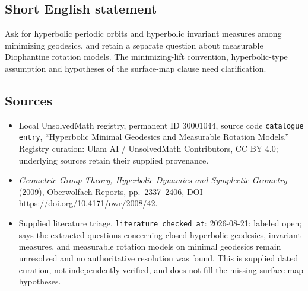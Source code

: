 \documentclass[11pt]{article}
\begin{document}
\subsection{Short English statement}
Ask for hyperbolic periodic orbits and hyperbolic invariant measures among minimizing geodesics, and retain a separate question about measurable Diophantine rotation models. The minimizing-lift convention, hyperbolic-type assumption and hypotheses of the surface-map clause need clarification.
\subsection{Sources}
\begin{itemize}
\item Local UnsolvedMath registry, permanent ID \(30001044\), source code \texttt{catalogue entry}, ``Hyperbolic Minimal Geodesics and Measurable Rotation Models.'' Registry curation: Ulam AI / UnsolvedMath Contributors, CC BY 4.0; underlying sources retain their supplied provenance.
\item \emph{Geometric Group Theory, Hyperbolic Dynamics and Symplectic Geometry} (2009), Oberwolfach Reports, pp.\ 2337--2406, DOI \url{https://doi.org/10.4171/owr/2008/42}.
\item Supplied literature triage, \texttt{literature\_checked\_at}: 2026-08-21: labeled open; says the extracted questions concerning closed hyperbolic geodesics, invariant measures, and measurable rotation models on minimal geodesics remain unresolved and no authoritative resolution was found. This is supplied dated curation, not independently verified, and does not fill the missing surface-map hypotheses.
\end{itemize}
\end{document}
